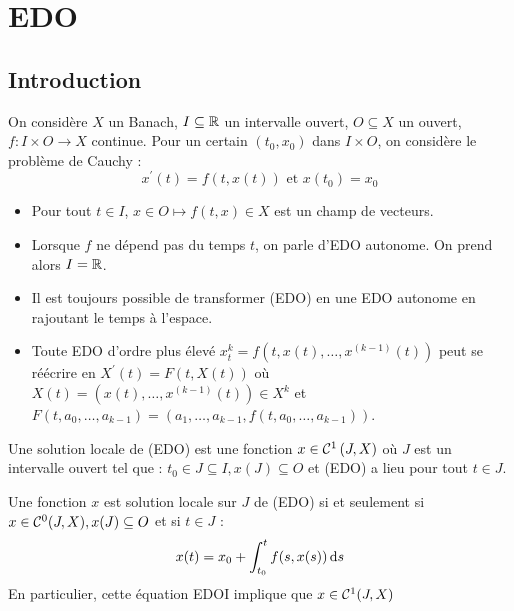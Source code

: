 \documentclass{cours}
\begin{document}
\section{EDO}
\subsection*{Introduction}
\begin{definition}
	On considère $X$ un Banach, $I \subseteq \mathbb{R}$ un intervalle ouvert, $O\subseteq X$ un ouvert, $f : I\times O\rightarrow X$ continue. Pour un certain $(t_{0}, x_{0})$ dans $I \times O$, on considère le problème de Cauchy : 
	\begin{equation}
		x^{'}(t) = f(t, x(t)) \text{ et } x(t_{0}) = x_{0}
	\end{equation}
\end{definition}

\begin{definition}
	\begin{itemize}
		\item Pour tout $t \in I$, $x\in O \mapsto f(t, x) \in X$ est un champ de vecteurs.
		\item Lorsque $f$ ne dépend pas du temps $t$, on parle d'EDO autonome. On prend alors $I = \mathbb{R}$.
		\item Il est toujours possible de transformer (EDO) en une EDO autonome en rajoutant le temps à l'espace.
		\item Toute EDO d'ordre plus élevé $x_{t}^{k} = f(t, x(t), \ldots, x^{\left(k-1\right)}(t))$ peut se réécrire en $X^{'}(t) = F(t, X(t))$ où $X(t) = \left(x(t), \ldots, x^{(k-1)}(t)\right)\in X^{k}$ et $F(t, a_{0}, \ldots, a_{k-1}) = (a_{1}, \ldots, a_{k-1}, f(t, a_{0}, \ldots, a_{k-1}))$.
	\end{itemize}
\end{definition}

\begin{definition}
	Une solution locale de (EDO) est une fonction $x \in \mathcal{C}^{1}\left(J, X\right)$ où $J$ est un intervalle ouvert tel que : $t_{0}\in J \subseteq I, x(J) \subseteq O$ et (EDO) a lieu pour tout $t \in J$.
\end{definition}

\begin{lemma}
	Une fonction $x$ est solution locale sur $J$ de (EDO) si et seulement si $x \in \mathcal{C}^{0}(J, X), x(J) \subseteq O$ et si $t \in J$ : 
	\begin{equation}
		x(t) = x_{0} + \int_{t_{0}}^{t} f(s, x(s)) {\rm \, d} s
	\end{equation}
	En particulier, cette équation EDOI implique que $x \in \mathcal{C}^{1}(J, X)$
\end{lemma}
\end{document}
